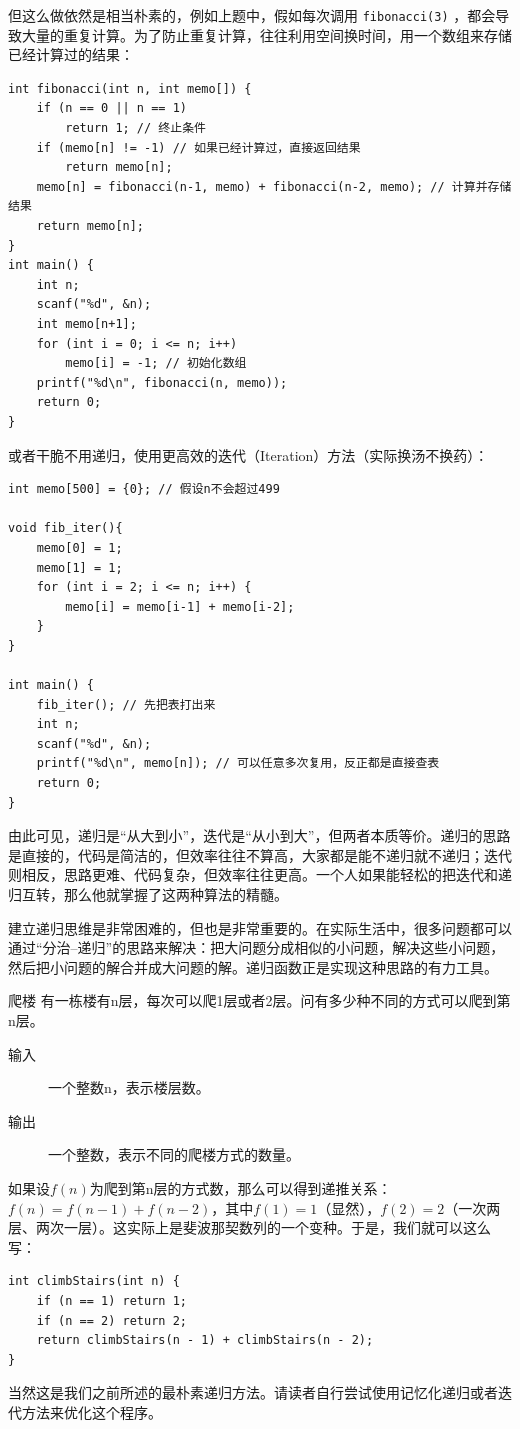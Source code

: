 但这么做依然是相当朴素的，例如上题中，假如每次调用 \verb|fibonacci(3)| ，都会导致大量的重复计算。为了防止重复计算，往往利用空间换时间，用一个数组来存储已经计算过的结果：
\begin{verbatim}
int fibonacci(int n, int memo[]) {
    if (n == 0 || n == 1)
        return 1; // 终止条件
    if (memo[n] != -1) // 如果已经计算过，直接返回结果
        return memo[n];
    memo[n] = fibonacci(n-1, memo) + fibonacci(n-2, memo); // 计算并存储结果
    return memo[n];
}
int main() {
    int n;
    scanf("%d", &n);
    int memo[n+1];
    for (int i = 0; i <= n; i++)
        memo[i] = -1; // 初始化数组
    printf("%d\n", fibonacci(n, memo));
    return 0;
}
\end{verbatim}
或者干脆不用递归，使用更高效的迭代（Iteration）方法（实际换汤不换药）：
\begin{verbatim}
int memo[500] = {0}; // 假设n不会超过499

void fib_iter(){
    memo[0] = 1;
    memo[1] = 1;
    for (int i = 2; i <= n; i++) {
        memo[i] = memo[i-1] + memo[i-2];
    }
}

int main() {
    fib_iter(); // 先把表打出来
    int n;
    scanf("%d", &n);
    printf("%d\n", memo[n]); // 可以任意多次复用，反正都是直接查表
    return 0;
}
\end{verbatim}

由此可见，递归是“从大到小”，迭代是“从小到大”，但两者本质等价。递归的思路是直接的，代码是简洁的，但效率往往不算高，大家都是能不递归就不递归；迭代则相反，思路更难、代码复杂，但效率往往更高。一个人如果能轻松的把迭代和递归互转，那么他就掌握了这两种算法的精髓。

建立递归思维是非常困难的，但也是非常重要的。在实际生活中，很多问题都可以通过“分治--递归”的思路来解决：把大问题分成相似的小问题，解决这些小问题，然后把小问题的解合并成大问题的解。递归函数正是实现这种思路的有力工具。

\begin{example}{爬楼}{}
    有一栋楼有n层，每次可以爬1层或者2层。问有多少种不同的方式可以爬到第n层。
    \begin{description}
        \item[输入] 一个整数n，表示楼层数。
        \item[输出] 一个整数，表示不同的爬楼方式的数量。
    \end{description}
    \tcblower
    如果设$f(n)$为爬到第n层的方式数，那么可以得到递推关系：$f(n) = f(n-1) + f(n-2)$，其中$f(1) = 1$（显然），$f(2) = 2$（一次两层、两次一层）。这实际上是斐波那契数列的一个变种。于是，我们就可以这么写：
    \begin{verbatim}
int climbStairs(int n) {
    if (n == 1) return 1;
    if (n == 2) return 2;
    return climbStairs(n - 1) + climbStairs(n - 2);
}
    \end{verbatim}
    当然这是我们之前所述的最朴素递归方法。请读者自行尝试使用记忆化递归或者迭代方法来优化这个程序。
\end{example}

